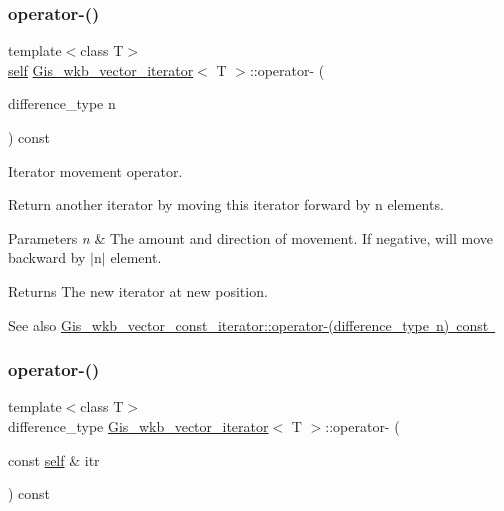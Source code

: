 \subsubsection{\texorpdfstring{operator-\/()}{operator-()}\hspace{0.1cm}{\footnotesize\ttfamily [1/2]}}
{\footnotesize\ttfamily template$<$class T$>$ \\
\mbox{\hyperlink{classGis__wkb__vector__const__iterator}{self}} \mbox{\hyperlink{classGis__wkb__vector__iterator}{Gis\+\_\+wkb\+\_\+vector\+\_\+iterator}}$<$ T $>$\+::operator-\/ (\begin{DoxyParamCaption}\item[{difference\+\_\+type}]{n }\end{DoxyParamCaption}) const\hspace{0.3cm}{\ttfamily [inline]}}



Iterator movement operator. 

Return another iterator by moving this iterator forward by n elements. 
\begin{DoxyParams}{Parameters}
{\em n} & The amount and direction of movement. If negative, will move backward by $\vert$n$\vert$ element. \\
\hline
\end{DoxyParams}
\begin{DoxyReturn}{Returns}
The new iterator at new position. 
\end{DoxyReturn}
\begin{DoxySeeAlso}{See also}
\mbox{\hyperlink{classGis__wkb__vector__const__iterator_ae63bd3cedff9cb57e5d6c45cb5ef4dff}{Gis\+\_\+wkb\+\_\+vector\+\_\+const\+\_\+iterator\+::operator-\/(difference\+\_\+type n) const }} 
\end{DoxySeeAlso}
\mbox{\label{classGis__wkb__vector__iterator_adc4bec71976681c3c3fb39da7a7068fa}} 
\subsubsection{\texorpdfstring{operator-\/()}{operator-()}\hspace{0.1cm}{\footnotesize\ttfamily [2/2]}}
{\footnotesize\ttfamily template$<$class T$>$ \\
difference\+\_\+type \mbox{\hyperlink{classGis__wkb__vector__iterator}{Gis\+\_\+wkb\+\_\+vector\+\_\+iterator}}$<$ T $>$\+::operator-\/ (\begin{DoxyParamCaption}\item[{const \mbox{\hyperlink{classGis__wkb__vector__const__iterator}{self}} \&}]{itr }\end{DoxyParamCaption}) const\hspace{0.3cm}{\ttfamily [inline]}}



